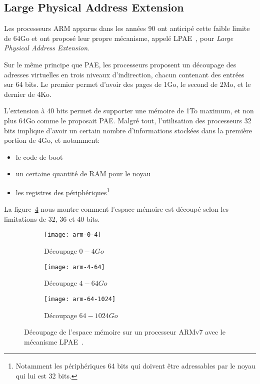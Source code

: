    \subsection{Large Physical Address Extension}

    Les processeurs ARM apparus dans les années 90 ont anticipé cette faible
    limite de 64Go et ont proposé leur propre mécanisme, appelé
    LPAE~\citep{arm2012principles,marinas2011linux}, pour \textit{Large Physical
      Address Extension}.

    Sur le même principe que PAE, les processeurs proposent un découpage des
    adresses virtuelles en trois niveaux d'indirection, chacun contenant des
    entrées sur 64 bits. Le premier permet d'avoir des pages de 1Go, le second
    de 2Mo, et le dernier de 4Ko.

    L'extension à 40 bits permet de supporter une mémoire de 1To maximum, et non
    plus 64Go comme le proposait PAE. Malgré tout, l'utilisation des processeurs
    32 bits implique d'avoir un certain nombre d'informations stockées dans la
    première portion de 4Go, et notamment:

    \begin{itemize}
      \item le code de boot
      \item un certaine quantité de RAM pour le noyau
      \item les registres des périphériques\footnote{Notamment les périphériques
        64 bits qui doivent être adressables par le noyau qui lui est 32 bits.}
    \end{itemize}

    La figure~\ref{fig:arm-0-1024} nous montre comment l'espace mémoire est
    découpé selon les limitations de 32, 36 et 40 bits.

    \begin{figure}[ht]
      \begin{subfigure}[b]{0.37\textwidth}
        \texttt{[image: arm-0-4]}
        \caption{Découpage $0-4Go$}
        \label{fig:arm-0-4}
      \end{subfigure}
      \begin{subfigure}[b]{0.37\textwidth}
        \texttt{[image: arm-4-64]}
        \caption{Découpage $4-64Go$}
        \label{fig:arm-4-64}
      \end{subfigure}
      \begin{subfigure}[b]{0.23\textwidth}
        \texttt{[image: arm-64-1024]}
        \caption{Découpage $64-1024Go$}
        \label{fig:arm-64-1024}
      \end{subfigure}
      \caption{Découpage de l'espace mémoire sur un processeur ARMv7 avec le
        mécanisme LPAE~\citep{arm2012principles}.}
      \label{fig:arm-0-1024}
    \end{figure}

